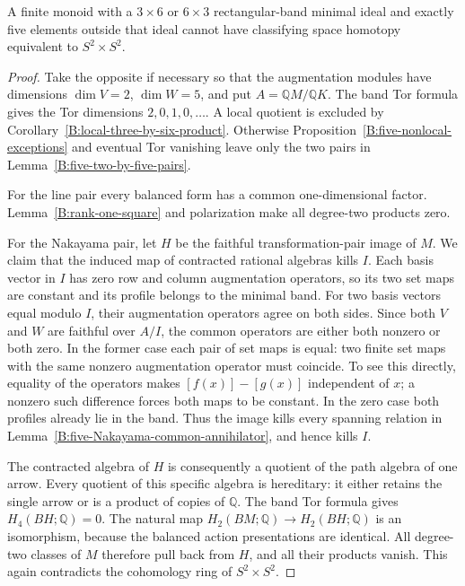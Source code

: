 \begin{proposition}\label{B:three-by-six-five-outside}
A finite monoid with a $3\times6$ or $6\times3$ rectangular-band
minimal ideal and exactly five elements outside that ideal
cannot have classifying space homotopy equivalent to
$S^2\times S^2$.
\end{proposition}
\begin{proof}
Take the opposite if necessary so that the augmentation modules
have dimensions $\dim V=2$, $\dim W=5$, and put
$A=\mathbb QM/\mathbb QK$.  The band Tor formula gives the
Tor dimensions $2,0,1,0,\ldots$.  A local quotient is excluded
by Corollary~\ref{B:local-three-by-six-product}.  Otherwise
Proposition~\ref{B:five-nonlocal-exceptions} and eventual Tor
vanishing leave only the two pairs in
Lemma~\ref{B:five-two-by-five-pairs}.

For the line pair every balanced form has a common
one-dimensional factor.  Lemma~\ref{B:rank-one-square} and
polarization make all degree-two products zero.

For the Nakayama pair, let $H$ be the faithful transformation-pair
image of $M$.  We claim that the induced map of contracted
rational algebras kills $I$.  Each basis vector in $I$ has zero
row and column augmentation operators, so its two set maps
are constant and its profile belongs to the minimal band.
For two basis vectors equal modulo $I$, their augmentation
operators agree on both sides.  Since both $V$ and $W$ are
faithful over $A/I$, the common operators are either both
nonzero or both zero.  In the former case each pair of set
maps is equal: two finite set maps with the same nonzero
augmentation operator must coincide.  To see this directly,
equality of the operators makes
$[f(x)]-[g(x)]$ independent of $x$; a nonzero such difference
forces both maps to be constant.  In the zero case both
profiles already lie in the band.  Thus the image kills every
spanning relation in Lemma~\ref{B:five-Nakayama-common-annihilator},
and hence kills $I$.

The contracted algebra of $H$ is consequently a quotient of
the path algebra of one arrow.  Every quotient of this specific
algebra is hereditary: it either retains the single arrow or
is a product of copies of $\mathbb Q$.  The band Tor formula
gives $H_4(BH;\mathbb Q)=0$.  The natural map
$H_2(BM;\mathbb Q)\to H_2(BH;\mathbb Q)$ is an isomorphism,
because the balanced action presentations are identical.
All degree-two classes of $M$ therefore pull back from $H$,
and all their products vanish.  This again contradicts the
cohomology ring of $S^2\times S^2$.
\end{proof}

